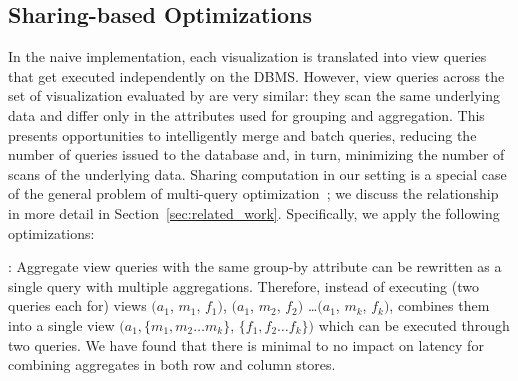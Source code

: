 
\subsection{Sharing-based Optimizations}
\label{sec:sharing_opt}


In the naive implementation, each visualization is translated into view
queries that get executed independently on the DBMS.
However, view queries across the set of visualization evaluated by \SeeDB
are very similar: they scan the same underlying data and differ only in the 
attributes used for grouping and aggregation.
This presents opportunities to intelligently merge and batch queries, reducing 
the number of queries issued to the database and, in turn, minimizing the number 
of scans of the underlying data.
Sharing computation in our setting is a special case of the general problem
of multi-query optimization~\cite{DBLP:journals/tods/Sellis88}; we discuss the 
relationship in more detail in Section~\ref{sec:related_work}.
Specifically, we apply the following optimizations:

: Aggregate view queries 
with the same group-by attribute can be 
rewritten as a single query with multiple aggregations. 
Therefore, instead of executing
(two queries each for) views $(a_1$, $m_1$, $f_1)$, $(a_1$, $m_2$, $f_2)$ 
\ldots $(a_1$, $m_k$, $f_k)$, \SeeDB combines them into a single view 
$(a_1, \{m_1, m_2\ldots m_k\}$, $\{f_1, f_2\ldots f_k\})$ which can be executed through
two queries.  
We have found that there is minimal to no impact on latency 
for combining aggregates in both row and column stores. 

